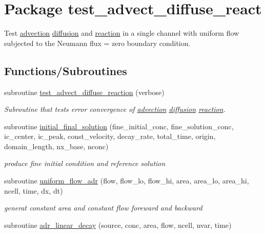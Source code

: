 \hypertarget{a00074}{
\section{Package test\_\-advect\_\-diffuse\_\-react}
\label{a00074}
}
Test \hyperlink{a00052}{advection} \hyperlink{a00056}{diffusion} and \hyperlink{a00068}{reaction} in a single channel with uniform flow subjected to the Neumann flux = zero boundary condition.  


\subsection*{Functions/Subroutines}
\begin{CompactItemize}
\item 
subroutine \hyperlink{a00074_934ab4a35a65983c1d52041a6c8c439d}{test\_\-advect\_\-diffuse\_\-reaction} (verbose)
\begin{CompactList}\small\item\em Subroutine that tests error convergence of \hyperlink{a00052}{advection} \hyperlink{a00056}{diffusion} \hyperlink{a00068}{reaction}. \item\end{CompactList}\item 
subroutine \hyperlink{a00074_5ee264a75b8c23710adbd0ab12473a15}{initial\_\-final\_\-solution} (fine\_\-initial\_\-conc, fine\_\-solution\_\-conc, ic\_\-center, ic\_\-peak, const\_\-velocity, decay\_\-rate, total\_\-time, origin, domain\_\-length, nx\_\-base, nconc)
\begin{CompactList}\small\item\em produce fine initial condition and reference solution \item\end{CompactList}\item 
subroutine \hyperlink{a00074_80f3a58632d50f76f33e2e90157c7afd}{uniform\_\-flow\_\-adr} (flow, flow\_\-lo, flow\_\-hi, area, area\_\-lo, area\_\-hi, ncell, time, dx, dt)
\begin{CompactList}\small\item\em generat constant area and constant flow foreward and backward \item\end{CompactList}\item 
subroutine \hyperlink{a00074_f699fd0394ef700425a90d7805215578}{adr\_\-linear\_\-decay} (source, conc, area, flow, ncell, nvar, time)
\end{CompactItemize}
